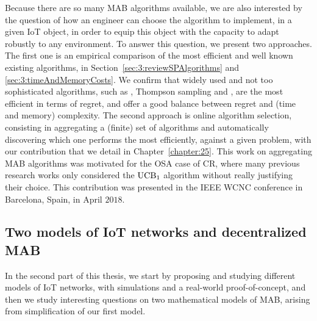 %
Because there are so many MAB algorithms available, we are also interested by the question of how an engineer can choose the algorithm to implement, in a given IoT object, in order to equip this object with the capacity to adapt robustly to any environment.
To answer this question, we present two approaches.
The first one is an empirical comparison of the most efficient and well known existing algorithms, in Section~\ref{sec:3:reviewSPAlgorithms} and \ref{sec:3:timeAndMemoryCosts}.
We confirm that widely used and not too sophisticated algorithms, such as \UCB{} \cite{Auer02}, Thompson sampling \cite{Thompson33} and \klUCB{} \cite{KLUCBJournal}, are the most efficient in terms of regret, and offer a good balance between regret and (time and memory) complexity.
The second approach is online algorithm selection, consisting in aggregating a (finite) set of algorithms and automatically discovering which one performs the most efficiently, against a given problem, with our contribution \Aggr{} that we detail in Chapter~\ref{chapter:25}.
This work on aggregating MAB algorithms was motivated for the OSA case of CR, where many previous research works only considered the $\mathrm{UCB}_1$ algorithm without really justifying their choice.
This contribution was presented in the IEEE WCNC conference in Barcelona, Spain, in April $2018$.


\subsection{Two models of IoT networks and decentralized MAB}

In the second part of this thesis, we start by proposing and studying different models of IoT networks, with simulations and a real-world proof-of-concept, and then we study interesting questions on two mathematical models of MAB, arising from simplification of our first model.


